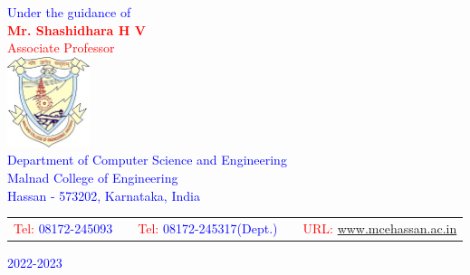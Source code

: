 \begin{titlepage}
\begin{center}
\vspace{.2in}
\textcolor{Blue}{Under the guidance of}\\
\textcolor{Red}{{\textbf{Mr. Shashidhara H V}}\\
Associate Professor}\\
\vspace{0.5cm}
\includegraphics[width=0.18\textwidth]{./mce_logo.png}\\[0.1in]

\textcolor{Blue}{\Large{Department of Computer Science and Engineering}\\
\Large{Malnad College of Engineering}\\
\normalsize
Hassan - 573202, Karnataka, India\\}

\vspace{0.5cm}

\begin{table}[h]
\centering
\begin{tabular}{lllll}
\textcolor{Red}{Tel:} \textcolor{Blue}{08172-245093} & & \textcolor{Red}{Tel:} \textcolor{Blue}{08172-245317(Dept.)} & & \textcolor{Red}{URL:} \textcolor{Blue}{\href{https://www.mcehassan.ac.in/}{www.mcehassan.ac.in}}\\
\end{tabular}
\end{table}
\vspace{0.2cm}
\textcolor{Blue}{2022-2023}

\end{center}

\end{titlepage}